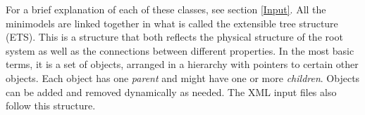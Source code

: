 \documentclass{article}
\begin{document}

\noindent For a brief explanation of each of these classes, see section \ref{Input}. All the minimodels are linked together in what is called the extensible tree structure (ETS). This is a structure that both reflects the physical structure of the root system as well as the connections between different properties. In the most basic terms, it is a set of objects, arranged in a hierarchy with pointers to certain other objects. Each object has one \textit{parent} and might have one or more \textit{children}. Objects can be added and removed dynamically as needed. The XML input files also follow this structure.\newline
 
\end{document}
